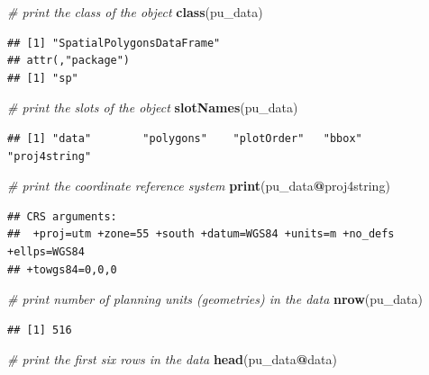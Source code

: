 \documentclass[12pt,]{book}
\newenvironment{Shaded}{\begin{snugshade}}{\end{snugshade}}
\newcommand{\KeywordTok}[1]{\textcolor[rgb]{0.13,0.29,0.53}{\textbf{#1}}}
\newcommand{\CommentTok}[1]{\textcolor[rgb]{0.56,0.35,0.01}{\textit{#1}}}
\newcommand{\OperatorTok}[1]{\textcolor[rgb]{0.81,0.36,0.00}{\textbf{#1}}}
\newcommand{\NormalTok}[1]{#1}
\begin{document}
\begin{Shaded}
\begin{Highlighting}[]
\CommentTok{# print the class of the object}
\KeywordTok{class}\NormalTok{(pu_data)}
\end{Highlighting}
\end{Shaded}

\begin{verbatim}
## [1] "SpatialPolygonsDataFrame"
## attr(,"package")
## [1] "sp"
\end{verbatim}

\begin{Shaded}
\begin{Highlighting}[]
\CommentTok{# print the slots of the object}
\KeywordTok{slotNames}\NormalTok{(pu_data)}
\end{Highlighting}
\end{Shaded}

\begin{verbatim}
## [1] "data"        "polygons"    "plotOrder"   "bbox"        "proj4string"
\end{verbatim}

\begin{Shaded}
\begin{Highlighting}[]
\CommentTok{# print the coordinate reference system}
\KeywordTok{print}\NormalTok{(pu_data}\OperatorTok{@}\NormalTok{proj4string)}
\end{Highlighting}
\end{Shaded}

\begin{verbatim}
## CRS arguments:
##  +proj=utm +zone=55 +south +datum=WGS84 +units=m +no_defs +ellps=WGS84
## +towgs84=0,0,0
\end{verbatim}

\begin{Shaded}
\begin{Highlighting}[]
\CommentTok{# print number of planning units (geometries) in the data}
\KeywordTok{nrow}\NormalTok{(pu_data)}
\end{Highlighting}
\end{Shaded}

\begin{verbatim}
## [1] 516
\end{verbatim}

\begin{Shaded}
\begin{Highlighting}[]
\CommentTok{# print the first six rows in the data}
\KeywordTok{head}\NormalTok{(pu_data}\OperatorTok{@}\NormalTok{data)}
\end{Highlighting}
\end{Shaded}
\end{document}
